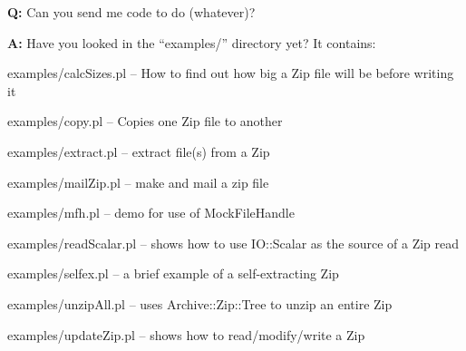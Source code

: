 \documentclass[]{article}
\let\realtextbf=\textbf
\renewcommand{\textbf}[1]{\textcolor{boldcolor}{\realtextbf{#1}}}
\begin{document}
\textbf{Q:} Can you send me code to do (whatever)?

\textbf{A:} Have you looked in the ``examples/'' directory yet? It
contains:

\begin{description}
\item[examples/calcSizes.pl -- How to find out how big a Zip file will
be before writing it]
\end{description}

\begin{description}
\item[examples/copy.pl -- Copies one Zip file to another]
\end{description}

\begin{description}
\item[examples/extract.pl -- extract file(s) from a Zip]
\end{description}

\begin{description}
\item[examples/mailZip.pl -- make and mail a zip file]
\end{description}

\begin{description}
\item[examples/mfh.pl -- demo for use of MockFileHandle]
\end{description}

\begin{description}
\item[examples/readScalar.pl -- shows how to use IO::Scalar as the
source of a Zip read]
\end{description}

\begin{description}
\item[examples/selfex.pl -- a brief example of a self-extracting Zip]
\end{description}

\begin{description}
\item[examples/unzipAll.pl -- uses Archive::Zip::Tree to unzip an entire
Zip]
\end{description}

\begin{description}
\item[examples/updateZip.pl -- shows how to read/modify/write a Zip]
\end{description}
\end{document}
